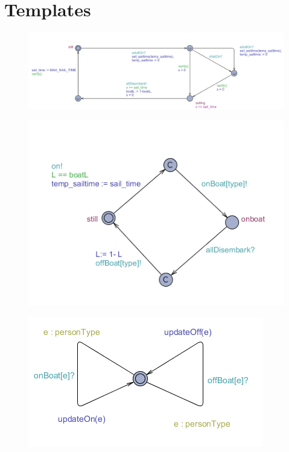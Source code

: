 \chapter{Templates}

\begin{figure}%
\includegraphics[width=\columnwidth]{pictures/boat.png}%
\caption{}%
\label{}%
\end{figure}


\begin{figure}%
\includegraphics[width=\columnwidth]{pictures/person.png}%
\caption{}%
\label{}%
\end{figure}


\begin{figure}%
\includegraphics[width=\columnwidth]{pictures/observer.png}%
\caption{}%
\label{}%
\end{figure}